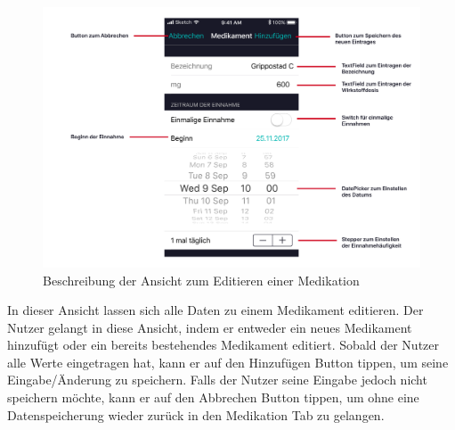 \documentclass[a4paper]{scrreprt}
\begin{document}
\begin{figure}[H]
\centering
\includegraphics[width=1\textwidth]{graphics/UIDescriptions/DetailedMedicationDesc}
\caption{Beschreibung der Ansicht zum Editieren einer Medikation}
\vspace{0.5cm}
\end{figure}
In dieser Ansicht lassen sich alle Daten zu einem Medikament editieren. Der Nutzer gelangt in diese Ansicht, indem er entweder ein neues Medikament hinzufügt oder ein bereits bestehendes Medikament editiert. Sobald der Nutzer alle Werte eingetragen hat, kann er auf den \dq Hinzufügen\dq{} Button tippen, um seine Eingabe/Änderung zu speichern. Falls der Nutzer seine Eingabe jedoch nicht speichern möchte, kann er auf den \dq Abbrechen\dq{} Button tippen, um ohne eine Datenspeicherung wieder zurück in den \dq Medikation\dq{} Tab zu gelangen.
\end{document}
